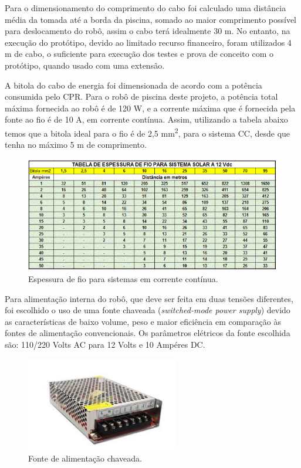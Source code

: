 Para o dimensionamento do comprimento do cabo foi calculado uma distância média
da tomada até a borda da piscina, somado ao maior comprimento possível para
deslocamento do robô, assim o cabo terá idealmente 30 m. No entanto, na execução
do protótipo, devido ao  limitado recurso financeiro, foram utilizados 4 m de
cabo, o suficiente para execução dos testes e prova de conceito com o protótipo,
quando usado com uma extensão. 

A bitola do cabo de energia foi dimensionada de acordo com a potência consumida
pelo CPR. Para o robô de piscina deste projeto, a potência total máxima
fornecida ao robô é de 120 W, e a corrente máxima que é fornecida pela fonte
ao fio é de 10 A, em corrente contínua. Assim, utilizando a tabela abaixo temos
que a bitola ideal para o fio é de 2,5 mm\textsuperscript{2}, para o sistema
\textsf{CC}, desde que tenha no máximo 5 m de comprimento.

\begin{figure}[h]
  \centering
  \includegraphics[width=\textwidth]{figuras/espessura-fio-cc.png}
  \caption{Espessura de fio para sistemas em corrente contínua.}
  \label{fig:espessura-fio-cc}
\end{figure}
\FloatBarrier

Para alimentação interna do robô, que deve ser feita em duas tensões diferentes,
foi escolhido o uso de uma fonte chaveada (\textit{switched-mode power supply})
devido as características de baixo volume, peso e maior eficiência em comparação
às fontes de alimentação convencionais. Os parâmetros elétricos da fonte escolhida
são: 110/220 Volts AC para 12 Volts e 10 Ampéres DC.

\begin{figure}[h]
  \centering
  \includegraphics[width=0.6\textwidth]{figuras/power-supply.png}
  \caption{Fonte de alimentação chaveada.}
  \label{fig:power-supply}
\end{figure}
\FloatBarrier

